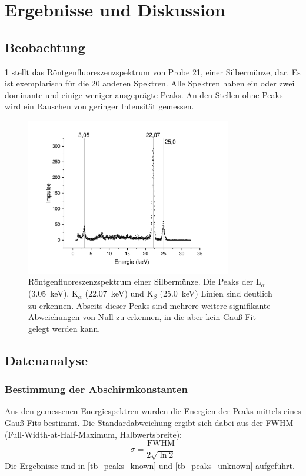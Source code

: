 \documentclass[
	a4paper,
	12pt,
	pagesize,
	ngerman
]{scrartcl}
\begin{document}
	\section{Ergebnisse und Diskussion}
	

	\subsection{Beobachtung}
	\cref{fig_ag_plot} stellt das Röntgenfluoreszenzspektrum von Probe 21, einer Silbermünze, dar.
	Es ist exemplarisch für die 20 anderen Spektren.
	Alle Spektren haben ein oder zwei dominante und einige weniger ausgeprägte Peaks.
	An den Stellen ohne Peaks wird ein Rauschen von geringer Intensität gemessen.
	\begin{figure}[H]
		\includegraphics[width=0.8\textwidth]{images/Silbermuenze}
		\centering
		\caption{Röntgenfluoreszenzspektrum einer Silbermünze. Die Peaks der $\text{L}_\alpha$ (\SI{3,05}{\kilo \electronvolt}), $\text{K}_\alpha$ (\SI{22,07}{\kilo \electronvolt}) und $\text{K}_\beta$ (\SI{25,0}{\kilo \electronvolt}) Linien sind deutlich zu erkennen. Abseits dieser Peaks sind mehrere weitere signifikante Abweichungen von Null zu erkennen, in die aber kein Gauß-Fit gelegt werden kann.}
		\label{fig_ag_plot}
		\centering
	\end{figure}
	
	\subsection{Datenanalyse}
	\subsubsection{Bestimmung der Abschirmkonstanten}
	Aus den gemessenen Energiespektren wurden die Energien der Peaks mittels eines Gauß-Fits bestimmt.
	Die Standardabweichung ergibt sich dabei aus der FWHM (Full-Width-at-Half-Maximum, Halbwertsbreite):
	\begin{equation}
		\sigma = \frac{\text{FWHM}}{2\sqrt{\ln 2}}
	\end{equation}
	Die Ergebnisse sind in \cref{tb_peaks_known} und \cref{tb_peaks_unknown} aufgeführt.
	
\end{document}
